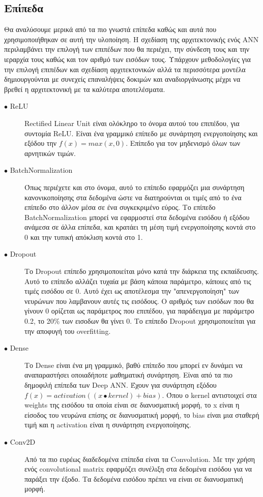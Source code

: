 \subsection{Επίπεδα}
Θα αναλύσουμε μερικά από τα πιο γνωστά επίπεδα καθώς και αυτά που χρησιμοποιήθηκαν σε αυτή την υλοποίηση. Η σχεδίαση της αρχιτεκτονικής ενός ANN περιλαμβάνει την επιλογή των επιπέδων που θα περιέχει, την σύνδεση τους και την ιεραρχία τους καθώς και τον αριθμό των εισόδων τους. Υπάρχουν μεθοδολογίες για την επιλογή επιπέδων και σχεδίαση αρχιτεκτονικών αλλά τα περισσότερα μοντέλα δημιουργούνται με συνεχείς επαναλήψεις δοκιμών και αναδιοργάνωσης μέχρι να βρεθεί η αρχιτεκτονική με τα καλύτερα αποτελέσματα.

\begin{description}

\item[$\bullet$ ReLU] Rectified Linear Unit είναι ολόκληρο το όνομα αυτού του επιπέδου, για συντομία ReLU. Είναι ένα γραμμικό επίπεδο με συνάρτηση ενεργοποίησης και εξόδου την $f(x) = max(x, 0)$. Επίπεδο για τον μηδενισμό όλων των αρνητικών τιμών.

\item[$\bullet$ BatchNormalization] Όπως περιέχετε και στο όνομα, αυτό το επίπεδο εφαρμόζει μια συνάρτηση κανονικοποίησης στα δεδομένα ώστε να διατηρούνται οι τιμές από το ένα επίπεδο στο άλλον μέσα σε ένα συγκεκριμένο εύρος. Το επίπεδο BatchNormalization μπορεί να εφαρμοστεί στα δεδομένα εισόδου ή εξόδου ανάμεσα σε άλλα επίπεδα, και κρατάει τη μέση τιμή ενεργοποίησης κοντά στο 0 και την τυπική απόκλιση κοντά στο 1.

\item[$\bullet$ Dropout ] Το Dropout επίπεδο χρησιμοποιείται μόνο κατά την διάρκεια της εκπαίδευσης. Αυτό το επίπεδο αλλάζει τυχαία με βάση κάποια παράμετρο, κάποιες από τις τιμές εισόδου σε 0. Αυτό έχει ως αποτέλεσμα την "απενεργοποίηση" των νευρώνων που λαμβανουν αυτές τις εισόδους. Ο αριθμός των εισόδων που θα γίνουν 0 ορίζεται ως παράμετρος που επιπέδου, για παράδειγμα με παράμετρο 0.2, το 20\% των εισοδων θα γίνει 0. Το επίπεδο Dropout χρησιμοποιείται για την αποφυγή του overfitting.

\item[$\bullet$ Dense] Το Dense είναι ένα μη γραμμικό, βαθύ επίπεδο που μπορεί εν δυνάμει να αναπαραστήσει οποιαδήποτε μαθηματική συνάρτηση. Είναι από τα πιο δημοφιλή επίπεδα των Deep ANN. Έχουν για συνάρτηση εξόδου  $f(x) = activation((x \bullet kernel) + bias)$. Όπου ο kernel αντιστοιχεί στα weights της εισόδου τα οποία είναι σε διανυσματική μορφή, το x είναι η είσοδος του νευρώνα επίσης σε διανυσματική μορφή, το bias είναι μια σταθερή τιμή και η activation είναι η συνάρτηση ενεργοποίησης.

\item[$\bullet$ Conv2D] Από τα πιο ευρέως διαδεδομένα επίπεδα είναι τα Convolution. Με την χρήση ενός convolutional matrix εφαρμόζει συνέλιξη στα δεδομένα εισόδου για να παράξει την έξοδο. Τα δεδομένα εισόδου πρέπει να είναι σε διανυσματική μορφή.

\end{description}



